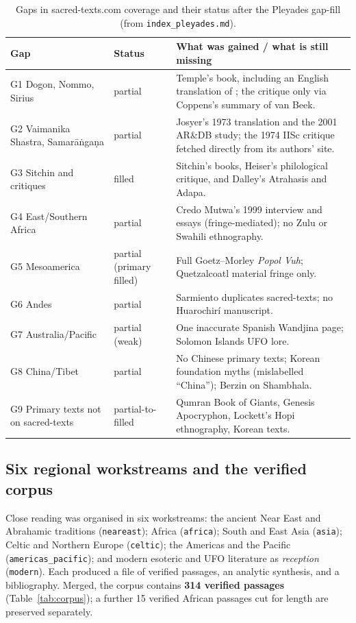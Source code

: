 \documentclass[11pt,a4paper]{article}
\begin{document}
\begin{table}[ht]
\centering\small
\caption{Gaps in sacred-texts.com coverage and their status after the Pleyades gap-fill (from \texttt{index\_pleyades.md}).}\label{tab:gaps}
\begin{tabularx}{\textwidth}{@{}p{3.9cm}p{2.1cm}X@{}}
\toprule
Gap & Status & What was gained / what is still missing \\
\midrule
G1 Dogon, Nommo, Sirius & partial & Temple's book, including an English translation of \textcite{griaule1950sirius}; the critique only via Coppens's summary of van Beek. \\
G2 Vaimanika Shastra, Samarāṅgaṇa & partial & Josyer's 1973 translation and the 2001 AR\&DB study; the 1974 IISc critique fetched directly from its authors' site. \\
G3 Sitchin and critiques & filled & Sitchin's books, Heiser's philological critique, and Dalley's Atrahasis and Adapa. \\
G4 East/Southern Africa & partial & Credo Mutwa's 1999 interview and essays (fringe-mediated); no Zulu or Swahili ethnography. \\
G5 Mesoamerica & partial (primary filled) & Full Goetz--Morley \emph{Popol Vuh}; Quetzalcoatl material fringe only. \\
G6 Andes & partial & Sarmiento duplicates sacred-texts; no Huarochirí manuscript. \\
G7 Australia/Pacific & partial (weak) & One inaccurate Spanish Wandjina page; Solomon Islands UFO lore. \\
G8 China/Tibet & partial & No Chinese primary texts; Korean foundation myths (mislabelled ``China''); Berzin on Shambhala. \\
G9 Primary texts not on sacred-texts & partial-to-filled & Qumran Book of Giants, Genesis Apocryphon, Lockett's Hopi ethnography, Korean texts. \\
\bottomrule
\end{tabularx}
\end{table}

\subsection{Six regional workstreams and the verified corpus}

Close reading was organised in six workstreams: the ancient Near East and Abrahamic traditions (\texttt{neareast}); Africa (\texttt{africa}); South and East Asia (\texttt{asia}); Celtic and Northern Europe (\texttt{celtic}); the Americas and the Pacific (\texttt{americas\_pacific}); and modern esoteric and UFO literature as \emph{reception} (\texttt{modern}). Each produced a file of verified passages, an analytic synthesis, and a bibliography. Merged, the corpus contains \textbf{314 verified passages} (Table~\ref{tab:corpus}); a further 15 verified African passages cut for length are preserved separately.
\end{document}
